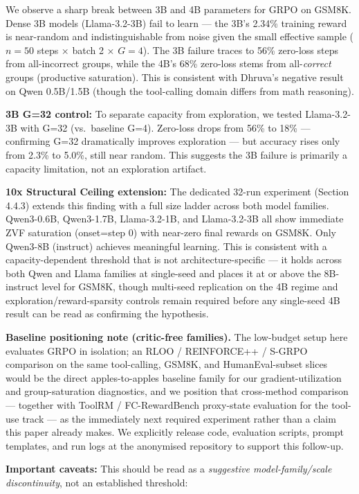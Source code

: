 \documentclass[
  american,
  11pt,
  a4paper,
  oneside]{report}
\begin{document}
We observe a sharp break between 3B and 4B parameters for GRPO on GSM8K.
Dense 3B models (Llama-3.2-3B) fail to learn --- the 3B's 2.34\%
training reward is near-random and indistinguishable from noise given
the small effective sample (\(n{=}50\) steps × batch 2 × \(G{=}4\)). The
3B failure traces to 56\% zero-loss steps from all-incorrect groups,
while the 4B's 68\% zero-loss stems from all-\emph{correct} groups
(productive saturation). This is consistent with Dhruva's negative
result on Qwen 0.5B/1.5B (though the tool-calling domain differs from
math reasoning).

\textbf{3B G=32 control:} To separate capacity from exploration, we
tested Llama-3.2-3B with G=32 (vs.~baseline G=4). Zero-loss drops from
56\% to 18\% --- confirming G=32 dramatically improves exploration ---
but accuracy rises only from 2.3\% to 5.0\%, still near random. This
suggests the 3B failure is primarily a capacity limitation, not an
exploration artifact.

\textbf{10x Structural Ceiling extension:} The dedicated 32-run
experiment (Section 4.4.3) extends this finding with a full size ladder
across both model families. Qwen3-0.6B, Qwen3-1.7B, Llama-3.2-1B, and
Llama-3.2-3B all show immediate ZVF saturation (onset=step 0) with
near-zero final rewards on GSM8K. Only Qwen3-8B (instruct) achieves
meaningful learning. This is consistent with a capacity-dependent
threshold that is not architecture-specific --- it holds across both
Qwen and Llama families at single-seed and places it at or above the
8B-instruct level for GSM8K, though multi-seed replication on the 4B
regime and exploration/reward-sparsity controls remain required before
any single-seed 4B result can be read as confirming the hypothesis.

\textbf{Baseline positioning note (critic-free families).} The
low-budget setup here evaluates GRPO in isolation; an RLOO / REINFORCE++
/ S-GRPO comparison on the same tool-calling, GSM8K, and
HumanEval-subset slices would be the direct apples-to-apples baseline
family for our gradient-utilization and group-saturation diagnostics,
and we position that cross-method comparison --- together with ToolRM /
FC-RewardBench proxy-state evaluation for the tool-use track --- as the
immediately next required experiment rather than a claim this paper
already makes. We explicitly release code, evaluation scripts, prompt
templates, and run logs at the anonymised repository to support this
follow-up.

\textbf{Important caveats:} This should be read as a \emph{suggestive
model-family/scale discontinuity}, not an established threshold:
\end{document}
